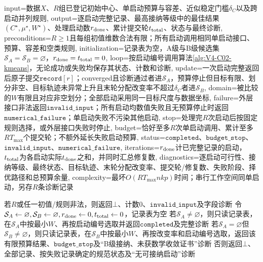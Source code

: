 \begin{AlgorithmContract}{
  input={数据$X$、$R$组已登记初始中心、单启动预算与容差、近似稳定门槛$\delta_C$以及跨启动并列规则},
  output={逐启动完整记录、最高接纳等级中的最佳结果$(C^\star,\mu^\star,W^\star)$、处理启动数$r_{\rm done}$、累计提交轮$t_{\rm total}$、状态与最终诊断},
  preconditions={$R\ge1$且每组初值维数合法有限；所有启动调用相同单启动接口、预算、容差和空类规则},
  initialization={记录表为空，A级与B级候选集$\mathcal S_A=\mathcal S_B=\varnothing$，$r_{\rm done}=t_{\rm total}=0$},
  loop={按启动编号调用算法\ref{alg:V4-C02-kmeans}，无论成功或失败均保存其状态、计数和诊断},
  update={一次启动完整返回后原子提交$\mathtt{record}[r]$；converged且诊断通过者进$\mathcal S_A$，预算停止但目标有限、划分非空、目标轨迹未异常上升且末轮分配改变率不超过$\delta_C$者进$\mathcal S_B$},
  domain={被比较的$W$有限且对应非空划分；全部启动采用同一目标尺度与数据坐标},
  failure={外层接口非法返回$\mathtt{invalid\_input}$；所有启动均数值失败且无预算停止时返回$\mathtt{numerical\_failure}$；单启动失败不污染其他启动},
  stop={处理完$R$次启动后按固定规则选择，或外层接口失败时停止},
  budget={恰好至多$R$次单启动调用、累计至多$RT_{\max}$个提交轮；不额外延长失败启动预算},
  status={$\mathtt{completed}$、$\mathtt{budget\_stop}$、$\mathtt{invalid\_input}$、$\mathtt{numerical\_failure}$},
  iterations={$r_{\rm done}$计已完整记录的启动，$t_{\rm total}$为各启动实际$t_{\rm done}$之和，并同时汇总修复数},
  diagnostics={逐启动可行性、接纳等级、最终状态、目标轨迹、末轮分配改变率、提交轮/修复数、失败阶段、择优路径和总预算余量},
  complexity={最坏$O(RT_{\max}nkp)$时间；串行工作空间同单启动，另存$R$条诊断记录}
}
\begin{algorithm}[H]
\caption{多启动\kMeans{}的记录与选择}\label{alg:V4-C02-kmeans-multistart}
若$R$或任一初值/规则非法，则返回$\bot$、计数$0$、$\mathtt{invalid\_input}$及字段诊断\;
令$\mathcal S_A\leftarrow\varnothing,\mathcal S_B\leftarrow\varnothing,r_{\rm done}\leftarrow0,t_{\rm total}\leftarrow0$，记录表为空\;
若$\mathcal S_A\ne\varnothing$，则只读记录表，在$\mathcal S_A$中按最小$W$、再按启动编号选取并返回$\mathtt{completed}$及完整诊断\;
若$\mathcal S_A=\varnothing$但$\mathcal S_B\ne\varnothing$，则只读记录表，在$\mathcal S_B$中按最小$W$、再按改变率和启动编号选取，返回该有限预算结果、$\mathtt{budget\_stop}$及“B级接纳、未获数学收敛证书”诊断\;
否则返回$\bot$、全部记录、按失败记录确定的规范状态及“无可接纳启动”诊断\;
\end{algorithm}
\end{AlgorithmContract}
\endgroup

